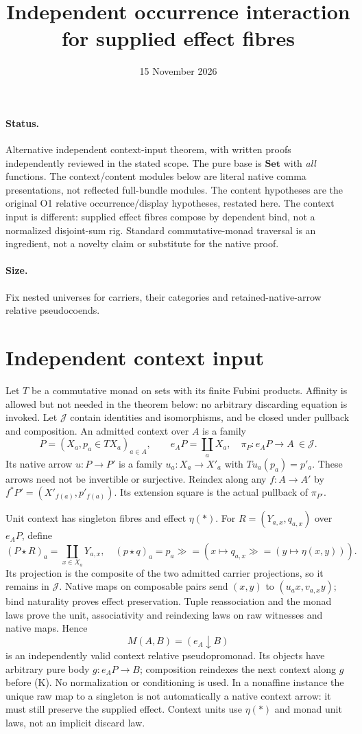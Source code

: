 \documentclass[11pt]{article}
\title{Independent occurrence interaction for supplied effect fibres}
\date{15 November 2026}
\begin{document}
\maketitle
\paragraph{Status.} Alternative independent context-input theorem, with written proofs independently reviewed in the stated scope. The pure base is $\mathbf{Set}$ with \emph{all} functions. The context/content modules below are literal native comma presentations, not reflected full-bundle modules. The content hypotheses are the original O1 relative occurrence/display hypotheses, restated here. The context input is different: supplied effect fibres compose by dependent bind, not a normalized disjoint-sum rig. Standard commutative-monad traversal is an ingredient, not a novelty claim or substitute for the native proof.
\paragraph{Size.} Fix nested universes for carriers, their categories and retained-native-arrow relative pseudocoends.

\section{Independent context input}
Let $T$ be a commutative monad on sets with its finite Fubini products. Affinity is allowed but not needed in the theorem below: no arbitrary discarding equation is invoked. Let $\mathcal J$ contain identities and isomorphisms, and be closed under pullback and composition. An admitted context over $A$ is a family
\[
 P=(X_a,p_a\in TX_a)_{a\in A},\qquad
 e_AP=\coprod_a X_a,\quad\pi_P:e_AP\to A\ \in\mathcal J.
\]
Its native arrow $u:P\to P'$ is a family $u_a:X_a\to X'_a$ with $Tu_a(p_a)=p'_a$. These arrows need not be invertible or surjective. Reindex along any $f:A\to A'$ by $f^*P'=(X'_{f(a)},p'_{f(a)})$. Its extension square is the actual pullback of $\pi_{P'}$.

Unit context has singleton fibres and effect $\eta(*)$. For $R=(Y_{a,x},q_{a,x})$ over $e_AP$, define
\[
 (P\star R)_a=\coprod_{x\in X_a}Y_{a,x},\quad
 (p\star q)_a=p_a\gg=(x\mapsto q_{a,x}\gg=(y\mapsto\eta(x,y))).\tag{K}
\]
Its projection is the composite of the two admitted carrier projections, so it remains in $\mathcal J$. Native maps on composable pairs send $(x,y)$ to $(u_a x,v_{a,x}y)$; bind naturality proves effect preservation. Tuple reassociation and the monad laws prove the unit, associativity and reindexing laws on raw witnesses and native maps. Hence
\[
 M(A,B)=(e_A\downarrow B)
\]
is an independently valid context relative pseudopromonad. Its objects have arbitrary pure body $g:e_AP\to B$; composition reindexes the next context along $g$ before (K). No normalization or conditioning is used. In a nonaffine instance the unique raw map to a singleton is not automatically a native context arrow: it must still preserve the supplied effect. Context units use $\eta(*)$ and monad unit laws, not an implicit discard law.
\end{document}
